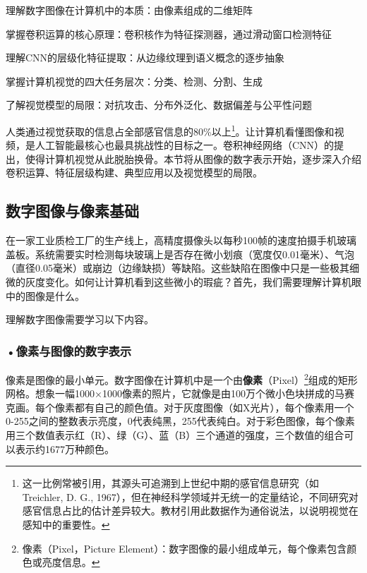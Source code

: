 
\begin{sectionkeypoints}
\item 理解数字图像在计算机中的本质：由像素组成的二维矩阵
\item 掌握卷积运算的核心原理：卷积核作为特征探测器，通过滑动窗口检测特征
\item 理解CNN的层级化特征提取：从边缘纹理到语义概念的逐步抽象
\item 掌握计算机视觉的四大任务层次：分类、检测、分割、生成
\item 了解视觉模型的局限：对抗攻击、分布外泛化、数据偏差与公平性问题
\end{sectionkeypoints}




人类通过视觉获取的信息占全部感官信息的80\%以上\footnote{这一比例常被引用，其源头可追溯到上世纪中期的感官信息研究（如 Treichler, D. G., 1967），但在神经科学领域并无统一的定量结论，不同研究对感官信息占比的估计差异较大。教材引用此数据作为通俗说法，以说明视觉在感知中的重要性。}。让计算机看懂图像和视频，是人工智能最核心也最具挑战性的目标之一。卷积神经网络（CNN）的提出，使得计算机视觉从此脱胎换骨。本节将从图像的数字表示开始，逐步深入介绍卷积运算、特征层级构建、典型应用以及视觉模型的局限。



\subsection{数字图像与像素基础}
在一家工业质检工厂的生产线上，高精度摄像头以每秒100帧的速度拍摄手机玻璃盖板。系统需要实时检测每块玻璃上是否存在微小划痕（宽度仅0.01毫米）、气泡（直径0.05毫米）或崩边（边缘缺损）等缺陷。这些缺陷在图像中只是一些极其细微的灰度变化。如何让计算机看到这些微小的瑕疵？首先，我们需要理解计算机眼中的图像是什么。



理解数字图像需要学习以下内容。

\subsubsection*{\textbf{•像素与图像的数字表示}}

像素是图像的最小单元。数字图像在计算机中是一个由\textbf{像素}（Pixel）\footnote{像素（Pixel，Picture Element）：数字图像的最小组成单元，每个像素包含颜色或亮度信息。}组成的矩形网格。想象一幅1000×1000像素的照片，它就像是由100万个微小色块拼成的马赛克画。每个像素都有自己的颜色值。对于灰度图像（如X光片），每个像素用一个0-255之间的整数表示亮度，0代表纯黑，255代表纯白。对于彩色图像，每个像素用三个数值表示红（R）、绿（G）、蓝（B）三个通道的强度，三个数值的组合可以表示约1677万种颜色。

